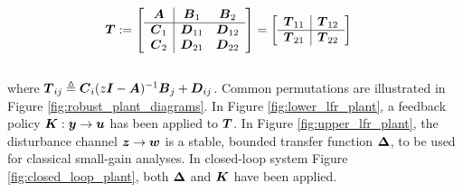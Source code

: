 \begin{equation}
\begin{aligned}
	\vb*{T} &:=
	\begin{bmatrix}
	\begin{array}{c|cc}
		\vb*{A} & \vb*{B}_{1} & \vb*{B}_{2}\\
		\hline
		\vb*{C}_{1} & \vb*{D}_{11} & \vb*{D}_{12}\\
		\vb*{C}_{2} & \vb*{D}_{21} & \vb*{D}_{22}\\
	\end{array}
	\end{bmatrix}
	=
	\begin{bmatrix}
	\begin{array}{c|cc}
		\vb*{T}_{11} & \vb*{T}_{12}\\
		\hline
		\vb*{T}_{21} & \vb*{T}_{22}\\
	\end{array}
	\end{bmatrix}
\end{aligned}
\end{equation}\\
where $\vb*{T}_{ij} \triangleq \vb*{C}_{i}(z\vb*{I} - \vb*{A})^{-1}\vb*{B}_{j} + \vb*{D}_{ij}$.  Common permutations are illustrated in Figure \ref{fig:robust_plant_diagrams}.  In Figure \ref{fig:lower_lfr_plant}, a feedback policy $\vb*{K}: \vb*{y} \rightarrow \vb*{u}$ has been applied to $\vb*{T}$.  In Figure \ref{fig:upper_lfr_plant}, the disturbance channel $\vb*{z} \rightarrow \vb*{w}$ is a stable, bounded transfer function $\vb*{\Delta}$, to be used for classical small-gain analyses.  In closed-loop system Figure \ref{fig:closed_loop_plant}, both $\vb*{\Delta}$ and $\vb*{K}$ have been applied.
